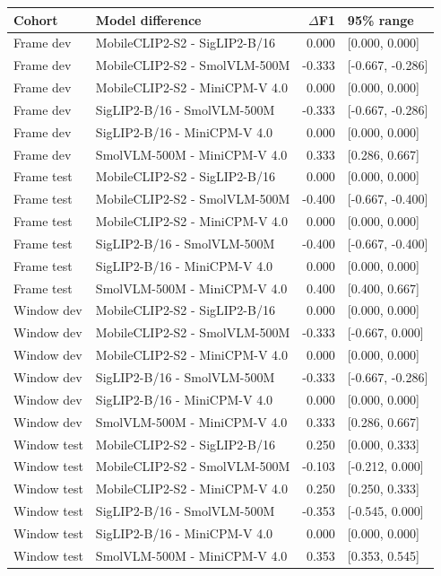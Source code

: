 \begin{longtable}{llrl}
\toprule
Cohort & Model difference & $\Delta$F1 & 95\% range \\
\midrule\endhead
Frame dev & MobileCLIP2-S2 - SigLIP2-B/16 & 0.000 & [0.000, 0.000] \\
Frame dev & MobileCLIP2-S2 - SmolVLM-500M & -0.333 & [-0.667, -0.286] \\
Frame dev & MobileCLIP2-S2 - MiniCPM-V 4.0 & 0.000 & [0.000, 0.000] \\
Frame dev & SigLIP2-B/16 - SmolVLM-500M & -0.333 & [-0.667, -0.286] \\
Frame dev & SigLIP2-B/16 - MiniCPM-V 4.0 & 0.000 & [0.000, 0.000] \\
Frame dev & SmolVLM-500M - MiniCPM-V 4.0 & 0.333 & [0.286, 0.667] \\
Frame test & MobileCLIP2-S2 - SigLIP2-B/16 & 0.000 & [0.000, 0.000] \\
Frame test & MobileCLIP2-S2 - SmolVLM-500M & -0.400 & [-0.667, -0.400] \\
Frame test & MobileCLIP2-S2 - MiniCPM-V 4.0 & 0.000 & [0.000, 0.000] \\
Frame test & SigLIP2-B/16 - SmolVLM-500M & -0.400 & [-0.667, -0.400] \\
Frame test & SigLIP2-B/16 - MiniCPM-V 4.0 & 0.000 & [0.000, 0.000] \\
Frame test & SmolVLM-500M - MiniCPM-V 4.0 & 0.400 & [0.400, 0.667] \\
Window dev & MobileCLIP2-S2 - SigLIP2-B/16 & 0.000 & [0.000, 0.000] \\
Window dev & MobileCLIP2-S2 - SmolVLM-500M & -0.333 & [-0.667, 0.000] \\
Window dev & MobileCLIP2-S2 - MiniCPM-V 4.0 & 0.000 & [0.000, 0.000] \\
Window dev & SigLIP2-B/16 - SmolVLM-500M & -0.333 & [-0.667, -0.286] \\
Window dev & SigLIP2-B/16 - MiniCPM-V 4.0 & 0.000 & [0.000, 0.000] \\
Window dev & SmolVLM-500M - MiniCPM-V 4.0 & 0.333 & [0.286, 0.667] \\
Window test & MobileCLIP2-S2 - SigLIP2-B/16 & 0.250 & [0.000, 0.333] \\
Window test & MobileCLIP2-S2 - SmolVLM-500M & -0.103 & [-0.212, 0.000] \\
Window test & MobileCLIP2-S2 - MiniCPM-V 4.0 & 0.250 & [0.250, 0.333] \\
Window test & SigLIP2-B/16 - SmolVLM-500M & -0.353 & [-0.545, 0.000] \\
Window test & SigLIP2-B/16 - MiniCPM-V 4.0 & 0.000 & [0.000, 0.000] \\
Window test & SmolVLM-500M - MiniCPM-V 4.0 & 0.353 & [0.353, 0.545] \\
\bottomrule
\end{longtable}
